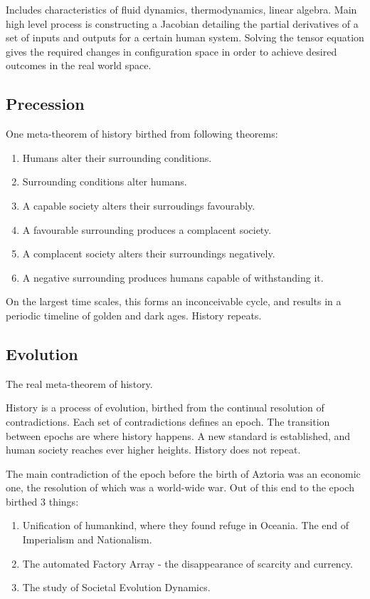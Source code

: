 \documentclass[11pt]{article}
\begin{document}
	Includes characteristics of fluid dynamics, thermodynamics, linear algebra.
	Main high level process is constructing a Jacobian detailing the partial derivatives of a set of inputs and outputs for a certain human system. 
	Solving the tensor equation gives the required changes in configuration space in order to achieve desired outcomes in the real world space.
	
	\subsection{Precession}
	One meta-theorem of history birthed from following theorems: 
	
	\begin{enumerate}
		\item Humans alter their surrounding conditions.
		\item Surrounding conditions alter humans.
		\item A capable society alters their surroudings favourably.
		\item A favourable surrounding produces a complacent society.
		\item A complacent society alters their surroundings negatively.
		\item A negative surrounding produces humans capable of withstanding it.
	\end{enumerate}
	
	On the largest time scales, this forms an inconceivable cycle, and results in a periodic timeline of golden and dark ages. 
	History repeats.
	
	\subsection{Evolution}
	The real meta-theorem of history.
	
	History is a process of evolution, birthed from the continual resolution of contradictions. 
	Each set of contradictions defines an epoch.
	The transition between epochs are where history happens.
	A new standard is established, and human society reaches ever higher heights. History does not repeat.
	
	The main contradiction of the epoch before the birth of Aztoria was an economic one, the resolution of which was a world-wide war.
	Out of this end to the epoch birthed 3 things:
	
	\begin{enumerate}
		\item Unification of humankind, where they found refuge in Oceania. The end of Imperialism and Nationalism.
		\item The automated Factory Array - the disappearance of scarcity and currency.
		\item The study of Societal Evolution Dynamics.
	\end{enumerate}
	
\end{document}
